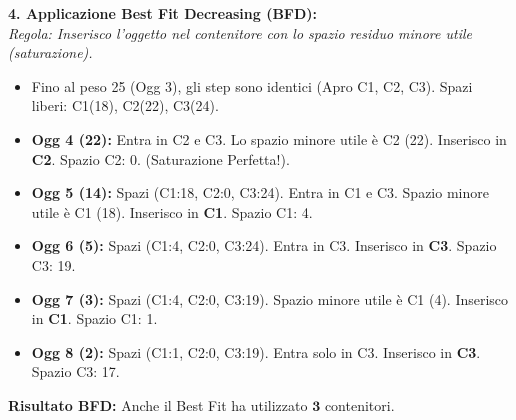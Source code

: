 \documentclass[12pt, a4paper]{article}
\begin{document}
	\vspace{0.2cm}
	\textbf{4. Applicazione Best Fit Decreasing (BFD):}\\
	\textit{Regola: Inserisco l'oggetto nel contenitore con lo spazio residuo minore utile (saturazione).}
	\begin{itemize}[label=$\circ$, itemsep=1pt, leftmargin=1.5cm]
		\item Fino al peso 25 (Ogg 3), gli step sono identici (Apro C1, C2, C3). Spazi liberi: C1(18), C2(22), C3(24).
		\item \textbf{Ogg 4 (22):} Entra in C2 e C3. Lo spazio minore utile è C2 (22). Inserisco in \textbf{C2}. Spazio C2: 0. (Saturazione Perfetta!).
		\item \textbf{Ogg 5 (14):} Spazi (C1:18, C2:0, C3:24). Entra in C1 e C3. Spazio minore utile è C1 (18). Inserisco in \textbf{C1}. Spazio C1: 4.
		\item \textbf{Ogg 6 (5):} Spazi (C1:4, C2:0, C3:24). Entra in C3. Inserisco in \textbf{C3}. Spazio C3: 19.
		\item \textbf{Ogg 7 (3):} Spazi (C1:4, C2:0, C3:19). Spazio minore utile è C1 (4). Inserisco in \textbf{C1}. Spazio C1: 1.
		\item \textbf{Ogg 8 (2):} Spazi (C1:1, C2:0, C3:19). Entra solo in C3. Inserisco in \textbf{C3}. Spazio C3: 17.
	\end{itemize}
	\textbf{Risultato BFD:} Anche il Best Fit ha utilizzato $\mathbf{3}$ contenitori.
	
\end{document}
